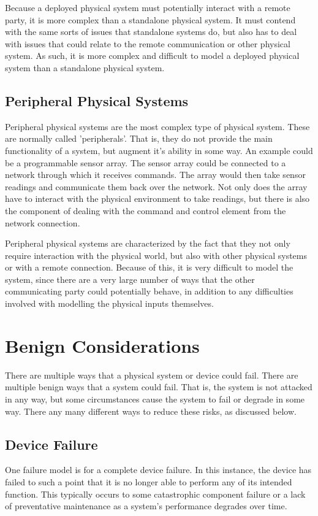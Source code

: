 Because a deployed physical system must potentially interact with a remote party, it is more complex than a standalone physical
system. It must contend with the same sorts of issues that standalone systems do, but also has to deal with issues that could
relate to the remote communication or other physical system.  As such, it is more complex and difficult to model a deployed
physical system than a standalone physical system.

\subsection{Peripheral Physical Systems}
Peripheral physical systems are the most complex type of physical system. These are normally called 'peripherals'. That
is, they do not provide the main functionality of a system, but augment it's ability in some way. An example could be a 
programmable sensor array. The sensor array could be connected to a network through which it receives commands. The array
would then take sensor readings and communicate them back over the network. Not only does the array have to 
interact with the physical environment to take readings, but there is also the component of dealing with the
command and control element from the network connection.

Peripheral physical systems are characterized by the fact that they not only require interaction with the physical world, but
also with other physical systems or with a remote connection. Because of this, it is very difficult to model the system, since
there are a very large number of ways that the other communicating party could potentially behave, in addition to any difficulties
involved with modelling the physical inputs themselves. 


\section{Benign Considerations}
There are multiple ways that a physical system or device could fail. There are multiple benign ways that a system could
fail. That is, the system is not attacked in any way, but some circumstances cause the system to fail or degrade in some
way. There any many different ways to reduce these risks, as discussed below.


\subsection{Device Failure}
One failure model is for a complete device failure. In this instance, the device has failed to such a point that it is no
longer able to perform any of its intended function. This typically occurs to some catastrophic component failure or a 
lack of preventative maintenance as a system's performance degrades over time.

